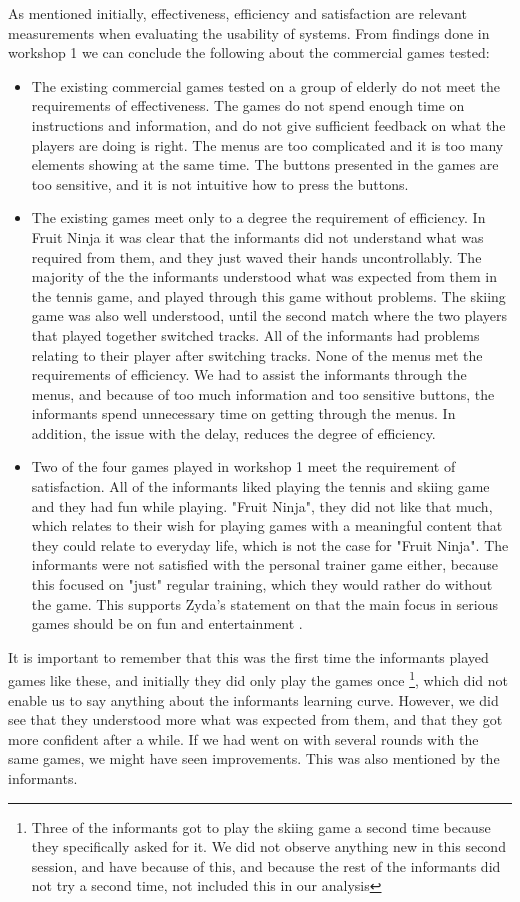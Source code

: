 As mentioned initially, effectiveness, efficiency  and satisfaction are relevant measurements when evaluating the usability of systems. From findings done in workshop 1 we can conclude the following about the commercial games tested: 
\begin{itemize}
\renewcommand{\labelitemi}{$\bullet$}
\item The existing commercial games tested on a group of elderly do not meet the requirements of effectiveness. The games do not spend enough time on instructions and information, and do not give sufficient feedback on what the players are doing is right. The menus are too complicated and it is too many elements showing at the same time. The buttons presented in the games are too sensitive, and it is not intuitive how to press the buttons. 
\item The existing games meet only to a degree the requirement of efficiency. In Fruit Ninja it was clear that the informants did not understand what was required from them, and they just waved their hands uncontrollably. The majority of the the informants understood what was expected from them in the tennis game, and played through this game without problems. The skiing game was also well understood, until the second match where the two players that played together switched tracks. All of the informants had problems relating to their player after switching tracks. None of the menus met the requirements of efficiency. We had to assist the informants through the menus, and because of too much information and too sensitive buttons, the informants spend unnecessary time on getting through the menus. In addition, the issue with the delay, reduces the degree of efficiency.
\item Two of the four games played in workshop 1 meet the requirement of satisfaction. All of the informants liked playing the tennis and skiing game and they had fun while playing. "Fruit Ninja", they did not like that much, which relates to their wish for playing games with a meaningful content that they could relate to everyday life, which is not the case for "Fruit Ninja". The informants were not satisfied with the personal trainer game either, because this focused on "just" regular training, which they would rather do without the game. This supports Zyda's statement on that the main focus in serious games should be on fun and entertainment \cite{zyda2005visual}. 
\end{itemize}

It is important to remember that this was the first time the informants played games like these, and initially they did only play the games once \footnote{Three of the informants got to play the skiing game a second time because they specifically asked for it. We did not observe anything new in this second session, and have because of this, and because the rest of the informants did not try a second time, not included this in our analysis}, which did not enable us to say anything about the informants learning curve. However, we did see that they understood more what was expected from them, and that they got more confident after a while. If we had went on with several rounds with the same games, we might have seen improvements. This was also mentioned by the informants. 

